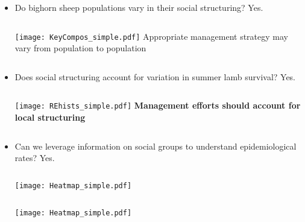 \documentclass[fleqn,xcolor=table]{beamer}
\begin{document}
{
\begin{frame}[t]
	\begin{itemize}
		\item[] \color{navy} \footnotesize Do bighorn sheep populations vary in their social
			structuring?
			\color{darkred} Yes.
	\begin{columns}
			\texttt{[image: KeyCompos\_simple.pdf]}
			\vspace{.1in}
			\footnotesize \color{darkred} Appropriate management
			strategy may vary from population to population
	\end{columns}
		\item[] \color{navy} \footnotesize Does social structuring account for variation in
			summer lamb survival?
			\color{darkred} Yes.
	\begin{columns}
		\column{.3\textwidth}
			\texttt{[image: REhists\_simple.pdf]}
			\vspace{.1in}
		\column{.7\textwidth}
			\footnotesize \color{darkred} \textbf{Management efforts should
			account for local structuring}
	\end{columns}

			\vspace{.1in}
		\item[] \color{navy} \footnotesize Can we leverage
				information on social groups to understand 
			epidemiological rates?
			\color{darkred} Yes.

	\begin{columns}
			\texttt{[image: Heatmap\_simple.pdf]}
			\vspace{.1in}
	\end{columns}
			\texttt{[image: Heatmap\_simple.pdf]}
	\end{itemize}
\end{frame}
}
\end{document}
